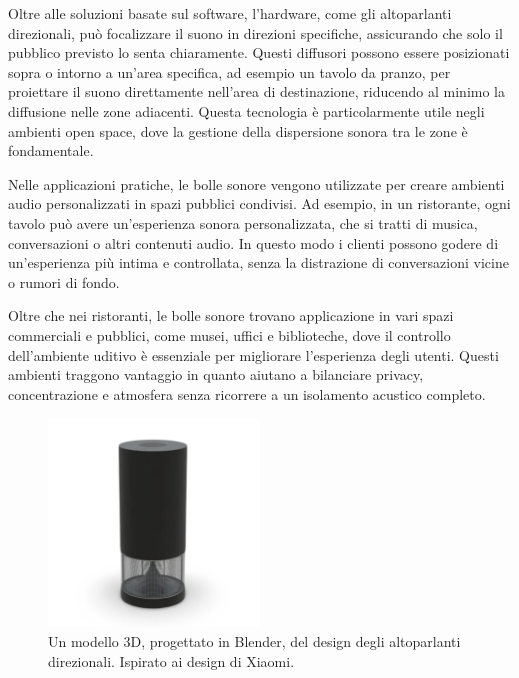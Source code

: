 Oltre alle soluzioni basate sul software, l'hardware, come gli altoparlanti direzionali, può focalizzare il suono in direzioni specifiche, assicurando che solo il pubblico previsto lo senta chiaramente. Questi diffusori possono essere posizionati sopra o intorno a un'area specifica, ad esempio un tavolo da pranzo, per proiettare il suono direttamente nell'area di destinazione, riducendo al minimo la diffusione nelle zone adiacenti. Questa tecnologia è particolarmente utile negli ambienti open space, dove la gestione della dispersione sonora tra le zone è fondamentale.

Nelle applicazioni pratiche, le bolle sonore vengono utilizzate per creare ambienti audio personalizzati in spazi pubblici condivisi. Ad esempio, in un ristorante, ogni tavolo può avere un'esperienza sonora personalizzata, che si tratti di musica, conversazioni o altri contenuti audio. In questo modo i clienti possono godere di un'esperienza più intima e controllata, senza la distrazione di conversazioni vicine o rumori di fondo. 

Oltre che nei ristoranti, le bolle sonore trovano applicazione in vari spazi commerciali e pubblici, come musei, uffici e biblioteche, dove il controllo dell'ambiente uditivo è essenziale per migliorare l'esperienza degli utenti. Questi ambienti traggono vantaggio in quanto aiutano a bilanciare privacy, concentrazione e atmosfera senza ricorrere a un isolamento acustico completo. \cite{cit-multiaudio}

\begin{figure}[H]
      \centering
      \includegraphics[width=0.5\textwidth]{Chapters/Figures/new_blender.png}
      \caption{\small Un modello 3D, progettato in Blender, del design degli altoparlanti direzionali. 
                        Ispirato ai design di Xiaomi. \cite{xiaomi2024}}
      \label{fig:blender_new}
\end{figure}